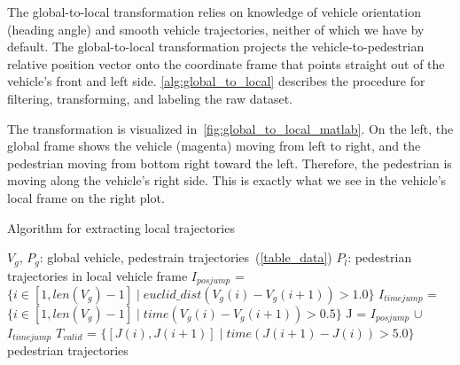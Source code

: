 The global-to-local transformation relies on knowledge of vehicle orientation (heading angle) and smooth vehicle trajectories, neither of which we have by default.
The global-to-local transformation projects the vehicle-to-pedestrian relative position vector onto the coordinate frame that points straight out of the vehicle's front and left side.
\cref{alg:global_to_local} describes the procedure for filtering, transforming, and labeling the raw dataset.

The transformation is visualized in~\cref{fig:global_to_local_matlab}.
On the left, the global frame shows the vehicle (magenta) moving from left to right, and the pedestrian moving from bottom right toward the left.
Therefore, the pedestrian is moving along the vehicle's right side.
This is exactly what we see in the vehicle's local frame on the right plot.

\begin{algorithm}\label{alg:global_to_local}
	\caption{Algorithm for extracting local trajectories}
	\begin{algorithmic}[1]
		\renewcommand{\algorithmicrequire}{\textbf{Input:}}
		\renewcommand{\algorithmicensure}{\textbf{Output:}}
		\REQUIRE $V_g$, $P_g$: global vehicle, pedestrain trajectories~(\cref{table_data})
		\ENSURE  $P_l$: pedestrian trajectories in local vehicle frame
			\STATE $I_{pos jump}$ = $\{i \in [1,len(V_g)-1] \mid euclid\_dist(V_g(i)-V_g(i+1))>1.0\}$
			\STATE $I_{time jump}$ = $\{i \in [1,len(V_g)-1] \mid time(V_g(i)-V_g(i+1))>0.5\}$
			\STATE J = $I_{pos jump}$ $\cup$ $I_{time jump}$
			\STATE $T_{valid}$ = $\{[J(i), J(i+1)] \mid time(J(i+1) - J(i)) > 5.0\}$
		\ENDFOR
		\RETURN pedestrian trajectories 
	\end{algorithmic} 
\end{algorithm}

